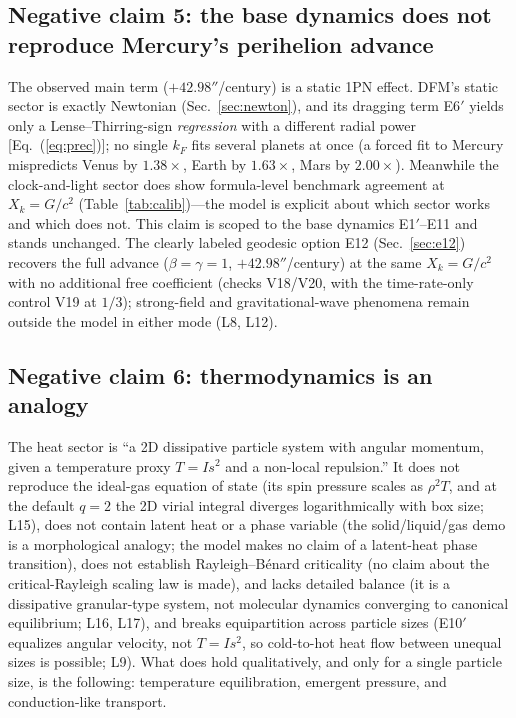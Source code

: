 \documentclass[aps,reprint,amsmath,amssymb,nofootinbib,superscriptaddress,floatfix]{revtex4-2}
\newcommand{\Kt}{X_k}
\begin{document}
\subsection{Negative claim 5: the base dynamics does not reproduce
Mercury's perihelion advance}
The observed main term ($+42.98''$/century) is a static 1PN effect.
DFM's static sector is exactly Newtonian
(Sec.~\ref{sec:newton}), and its dragging term E6$'$ yields only a
Lense--Thirring-sign \emph{regression} with a different radial power
[Eq.~(\ref{eq:prec})]; no single $k_F$ fits several planets at once
(a forced fit to Mercury mispredicts Venus by $1.38\times$, Earth by
$1.63\times$, Mars by $2.00\times$).
Meanwhile the clock-and-light sector does show formula-level benchmark
agreement at $\Kt = G/c^2$ (Table~\ref{tab:calib})---the model is
explicit about which sector works and which does not.
This claim is scoped to the base dynamics E1$'$--E11 and stands
unchanged.
The clearly labeled geodesic option E12 (Sec.~\ref{sec:e12}) recovers
the full advance ($\beta = \gamma = 1$, $+42.98''$/century) at the
same $\Kt = G/c^2$ with no additional free coefficient (checks
V18/V20, with the time-rate-only control V19 at $1/3$); strong-field
and gravitational-wave phenomena remain outside the model in either
mode (L8, L12).

\subsection{Negative claim 6: thermodynamics is an analogy}
The heat sector is ``a 2D dissipative particle system with angular
momentum, given a temperature proxy $T = Is^2$ and a non-local
repulsion.''
It does not reproduce the ideal-gas equation of state (its spin
pressure scales as $\rho^2T$, and at the default $q = 2$ the 2D virial
integral diverges logarithmically with box size; L15), does not
contain latent heat or a phase variable (the solid/liquid/gas demo is
a morphological analogy; the model makes no claim of a
latent-heat phase transition), does not establish
Rayleigh--B\'enard criticality (no claim about the critical-Rayleigh
scaling law is made), and lacks detailed balance (it is a
dissipative granular-type system, not molecular dynamics converging to
canonical equilibrium; L16, L17), and breaks equipartition across
particle sizes (E10$'$ equalizes angular velocity, not $T = Is^2$,
so cold-to-hot heat flow between unequal sizes is possible; L9).
What does hold qualitatively, and only for a single particle size, is
the following: temperature equilibration, emergent pressure, and
conduction-like transport.
\end{document}
